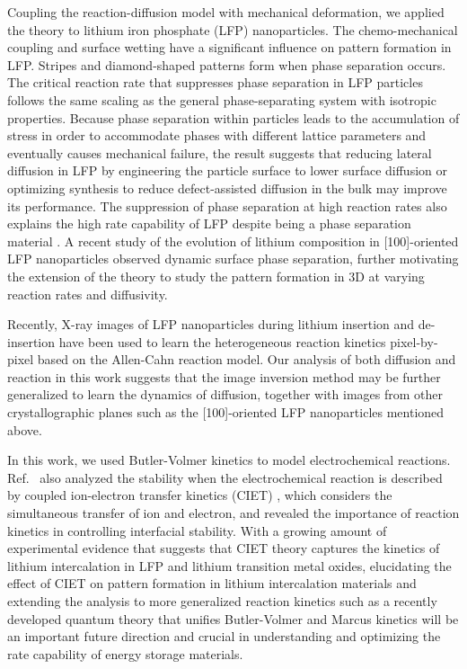 \documentclass[reprint,aps,pre,superscriptaddress]{revtex4-2}
\begin{document}
Coupling the reaction-diffusion model with mechanical deformation, we applied the theory to lithium iron phosphate (LFP) nanoparticles.
The chemo-mechanical coupling and surface wetting have a significant influence on pattern formation in LFP. Stripes and diamond-shaped patterns form when phase separation occurs. The critical reaction rate that suppresses phase separation in LFP particles follows the same scaling as the general phase-separating system with isotropic properties. Because phase separation within particles leads to the accumulation of stress in order to accommodate phases with different lattice parameters and eventually causes mechanical failure, the result suggests that reducing lateral diffusion in LFP by engineering the particle surface to lower surface diffusion or optimizing synthesis to reduce defect-assisted diffusion in the bulk may improve its performance. The suppression of phase separation at high reaction rates also explains the high rate capability of LFP despite being a phase separation material \cite{Padhi1997,Kang2009,Bazant2013}.
A recent study of the evolution of lithium composition in [100]-oriented LFP nanoparticles observed dynamic surface phase separation\cite{Koo2023}, further motivating the extension of the theory to study the pattern formation in 3D at varying reaction rates and diffusivity.

Recently, X-ray images of LFP nanoparticles during lithium insertion and de-insertion have been used to learn the heterogeneous reaction kinetics pixel-by-pixel based on the Allen-Cahn reaction model\cite{Zhao2023LFP}. Our analysis of both diffusion and reaction in this work suggests that the image inversion method may be further generalized to learn the dynamics of diffusion, together with images from other crystallographic planes such as the [100]-oriented LFP nanoparticles mentioned above. 

In this work, we used Butler-Volmer kinetics to model electrochemical reactions. Ref.~\cite{Fraggedakis2020a} also analyzed the stability when the electrochemical reaction is described by coupled ion-electron transfer kinetics (CIET) \cite{Fraggedakis2021}, which considers the simultaneous transfer of ion and electron, and revealed the importance of reaction kinetics in controlling interfacial stability. With a growing amount of experimental evidence that suggests that CIET theory captures the kinetics of lithium intercalation in LFP \cite{Zhao2023LFP} and lithium transition metal oxides, elucidating the effect of CIET on pattern formation in lithium intercalation materials and extending the analysis to more generalized reaction kinetics such as a recently developed quantum theory that unifies Butler-Volmer and Marcus kinetics \cite{Bazant2023} will be an important future direction and crucial in understanding and optimizing the rate capability of energy storage materials.
\end{document}
